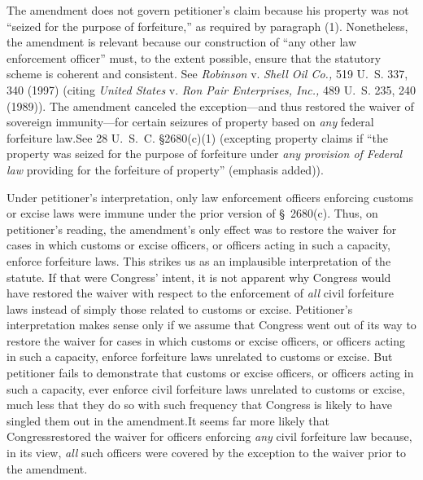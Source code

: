   The amendment does not govern petitioner's claim because his property was not ``seized for the purpose of forfeiture,'' \starpage as required by paragraph (1). Nonetheless, the amendment is relevant because our construction of ``any other law enforcement officer'' must, to the extent possible, ensure that the statutory scheme is coherent and consistent. See \emph{Robinson} v. \emph{Shell Oil Co.,} 519 U.~S. 337, 340 (1997) (citing \emph{United States} v. \emph{Ron Pair Enterprises, Inc.,} 489 U.~S. 235, 240 (1989)). The amendment canceled the exception---and thus restored the waiver of sovereign immunity---for certain seizures of property based on \emph{any} federal forfeiture law.See 28 U.~S.~C. \S2680(c)(1) (excepting property claims if ``the property was seized for the purpose of forfeiture under \emph{any provision of Federal law} providing for the forfeiture of property'' (emphasis added)).

  Under petitioner's interpretation, only law enforcement officers enforcing customs or excise laws were immune under the prior version of \S~2680(c). Thus, on petitioner's reading, the amendment's only effect was to restore the waiver for cases in which customs or excise officers, or officers acting in such a capacity, enforce forfeiture laws. This strikes us as an implausible interpretation of the statute. If that were Congress' intent, it is not apparent why Congress would have restored the waiver with respect to the enforcement of \emph{all} civil forfeiture laws instead of simply those related to customs or excise. Petitioner's interpretation makes sense only if we assume that Congress went out of its way to restore the waiver for cases in which customs or excise officers, or officers acting in such a capacity, enforce forfeiture laws unrelated to customs or excise. But petitioner fails to demonstrate that customs or excise officers, or officers acting in such a capacity, ever enforce civil forfeiture laws unrelated to customs or excise, much less that they do so with such frequency that Congress is likely to have singled them out in the amendment.\footnotemark[5] It seems far more likely that Congress\starpage  restored the waiver for officers enforcing \emph{any} civil forfeiture law because, in its view, \emph{all} such officers were covered by the exception to the waiver prior to the amendment.

